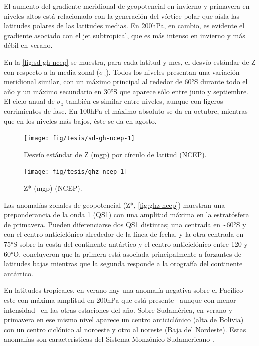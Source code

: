 \documentclass[spanish,a4paper,12pt,oneside]{book}
\begin{document}
El aumento del gradiente meridional de geopotencial en invierno y
primavera en niveles altos está relacionado con la generación del
vórtice polar que aísla las latitudes polares de las latitudes medias.
En 200hPa, en cambio, es evidente el gradiente asociado con el jet
subtropical, que es más intenso en invierno y más débil en verano.

En la \autoref{fig:sd-gh-ncep} se muestra, para cada latitud y mes, el
desvío estándar de Z con respecto a la media zonal (\(\sigma_z\)). Todos
los niveles presentan una variación meridional similar, con un máximo
principal al rededor de 60°S durante todo el año y un máximo secundario
en 30°S que aparece sólo entre junio y septiembre. El ciclo anual de
\(\sigma_z\) también es similar entre niveles, aunque con ligeros
corrimientos de fase. En 100hPa el máximo absoluto se da en octubre,
mientras que en los niveles más bajos, éste se da en agosto.

\begin{figure}
\texttt{[image: fig/tesis/sd-gh-ncep-1]} \caption{Desvío estándar de Z (mgp) por círculo de latitud (NCEP).}\label{fig:sd-gh-ncep}
\end{figure}

\begin{landscape}\begin{figure}

{\centering \texttt{[image: fig/tesis/ghz-ncep-1]} 

}

\caption{Z* (mgp) (NCEP).}\label{fig:ghz-ncep}
\end{figure}
\end{landscape}

Las anomalías zonales de geopotencial (Z*, \autoref{fig:ghz-ncep})
muestran una preponderancia de la onda 1 (QS1) con una amplitud máxima
en la estratósfera de primavera. Pueden diferenciarse dos QS1 distintas;
una centrada en \textasciitilde{}60°S y con el centro anticiclónico
alrededor de la línea de fecha, y la otra centrada en 75°S sobre la
costa del continente antártico y el centro anticiclónico entre 120 y
60°O. \citet{Quintanar1995} concluyeron que la primera está asociada
principalmente a forzantes de latitudes bajas mientras que la segunda
responde a la orografía del continente antártico.

En latitudes tropicales, en verano hay una anomalía negativa sobre el
Pacífico este con máxima amplitud en 200hPa que está presente --aunque
con menor intensidad-- en las otras estaciones del año. Sobre
Sudamérica, en verano y primavera en ese mismo nivel aparece un centro
anticiclónico (alta de Bolivia) con un centro ciclónico al noroeste y
otro al noreste (Baja del Nordeste). Estas anomalías son características
del Sistema Monzónico Sudamericano \citep{Vera2006}.
\end{document}
